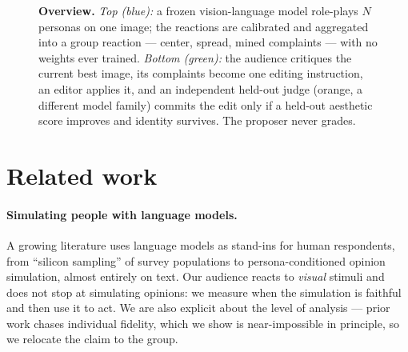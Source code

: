 \documentclass{article}
\begin{document}
\begin{figure}[t]
  \caption{\textbf{Overview.} \emph{Top (blue):} a frozen vision-language model role-plays $N$ personas on one image; the reactions are calibrated and aggregated into a group reaction --- center, spread, mined complaints --- with no weights ever trained. \emph{Bottom (green):} the audience critiques the current best image, its complaints become one editing instruction, an editor applies it, and an independent held-out judge (orange, a different model family) commits the edit only if a held-out aesthetic score improves and identity survives. The proposer never grades.}
  \label{fig:overview}
\end{figure}


\section{Related work}

\paragraph{Simulating people with language models.} A growing literature uses language models as stand-ins for human respondents, from ``silicon sampling'' of survey populations \citep{argyle2023} to persona-conditioned opinion simulation, almost entirely on text. Our audience reacts to \emph{visual} stimuli and does not stop at simulating opinions: we measure when the simulation is faithful and then use it to act. We are also explicit about the level of analysis --- prior work chases individual fidelity, which we show is near-impossible in principle, so we relocate the claim to the group.
\end{document}
